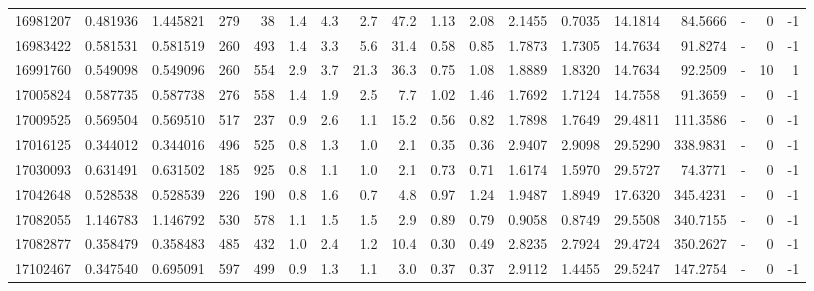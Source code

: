 \begin{tabular}{rrrrrrrrrrrrrrrlrr}
  16981207 & 0.481936 &   1.445821 &  279 &   38 &      1.4 &      4.3 &     2.7 &     47.2 &       1.13 &        2.08 &  2.1455 &  0.7035 &   14.1814 &   84.5666 &             - &        0 &         -1 \\
  16983422 & 0.581531 &   0.581519 &  260 &  493 &      1.4 &      3.3 &     5.6 &     31.4 &       0.58 &        0.85 &  1.7873 &  1.7305 &   14.7634 &   91.8274 &             - &        0 &         -1 \\
  16991760 & 0.549098 &   0.549096 &  260 &  554 &      2.9 &      3.7 &    21.3 &     36.3 &       0.75 &        1.08 &  1.8889 &  1.8320 &   14.7634 &   92.2509 &             - &       10 &          1 \\
  17005824 & 0.587735 &   0.587738 &  276 &  558 &      1.4 &      1.9 &     2.5 &      7.7 &       1.02 &        1.46 &  1.7692 &  1.7124 &   14.7558 &   91.3659 &             - &        0 &         -1 \\
  17009525 & 0.569504 &   0.569510 &  517 &  237 &      0.9 &      2.6 &     1.1 &     15.2 &       0.56 &        0.82 &  1.7898 &  1.7649 &   29.4811 &  111.3586 &             - &        0 &         -1 \\
  17016125 & 0.344012 &   0.344016 &  496 &  525 &      0.8 &      1.3 &     1.0 &      2.1 &       0.35 &        0.36 &  2.9407 &  2.9098 &   29.5290 &  338.9831 &             - &        0 &         -1 \\
  17030093 & 0.631491 &   0.631502 &  185 &  925 &      0.8 &      1.1 &     1.0 &      2.1 &       0.73 &        0.71 &  1.6174 &  1.5970 &   29.5727 &   74.3771 &             - &        0 &         -1 \\
  17042648 & 0.528538 &   0.528539 &  226 &  190 &      0.8 &      1.6 &     0.7 &      4.8 &       0.97 &        1.24 &  1.9487 &  1.8949 &   17.6320 &  345.4231 &             - &        0 &         -1 \\
  17082055 & 1.146783 &   1.146792 &  530 &  578 &      1.1 &      1.5 &     1.5 &      2.9 &       0.89 &        0.79 &  0.9058 &  0.8749 &   29.5508 &  340.7155 &             - &        0 &         -1 \\
  17082877 & 0.358479 &   0.358483 &  485 &  432 &      1.0 &      2.4 &     1.2 &     10.4 &       0.30 &        0.49 &  2.8235 &  2.7924 &   29.4724 &  350.2627 &             - &        0 &         -1 \\
  17102467 & 0.347540 &   0.695091 &  597 &  499 &      0.9 &      1.3 &     1.1 &      3.0 &       0.37 &        0.37 &  2.9112 &  1.4455 &   29.5247 &  147.2754 &             - &        0 &         -1 \\

\end{tabular}
